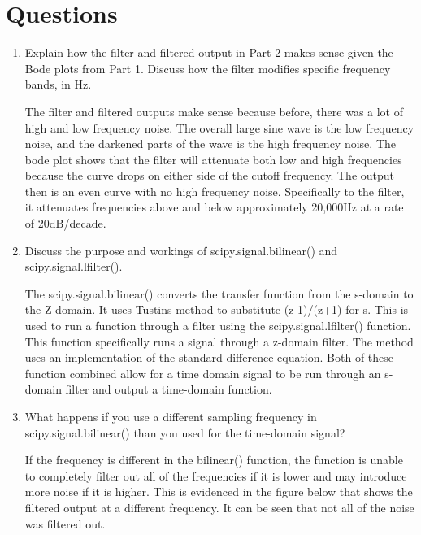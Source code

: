\documentclass[12pt, titlepage]{article}
\begin{document}
    \section{Questions}
    \begin{enumerate}
        \item Explain how the filter and filtered output in Part 2 makes sense given the Bode plots from
                Part 1. Discuss how the filter modifies specific frequency bands, in Hz.

                The filter and filtered outputs make sense because before, there was a lot of high and low frequency noise.  The overall large sine wave is the low frequency noise, and the darkened parts of the wave is the high frequency noise.  The bode plot shows that the filter will attenuate both low and high frequencies because the curve drops on either side of the cutoff frequency.  The output then is an even curve with no high frequency noise. 
                Specifically to the filter, it attenuates frequencies above and below approximately 20,000Hz at a rate of 20dB/decade.


        \item Discuss the purpose and workings of scipy.signal.bilinear() and scipy.signal.lfilter().
        
        
                The scipy.signal.bilinear() converts the transfer function from the s-domain to the Z-domain.  It uses Tustins method to substitute (z-1)/(z+1) for s.  This is used to run a function through a filter using the scipy.signal.lfilter() function.  This function specifically runs a signal through a z-domain filter.  The method uses an implementation of the standard difference equation.  Both of these function combined allow for a time domain signal to be run through an s-domain filter and output a time-domain function.
        
        \item What happens if you use a different sampling frequency in scipy.signal.bilinear() than
                you used for the time-domain signal?
                
                If the frequency is different in the bilinear() function, the function is unable to completely filter out all of the frequencies if it is lower and may introduce more noise if it is higher.  This is evidenced in the figure below that shows the filtered output at a different frequency.  It can be seen that not all of the noise was filtered out.
                

\end{enumerate}
\end{document}

